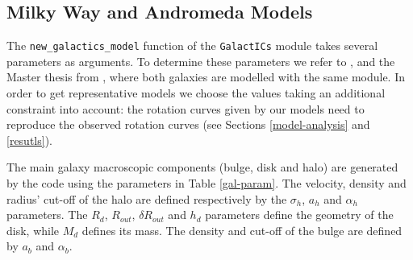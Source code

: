 \documentclass[a4paper,12pt, english]{article}
\begin{document}
\subsection{Milky Way and Andromeda Models}
\label{mw-m31-models}
The \texttt{new\_galactics\_model} function of the \texttt{GalactICs} module takes several parameters as arguments. To determine these parameters we refer to \textcite{Widrow_2005}, \textcite{Widrow_2008} and the Master thesis from \textcite{Withagen_2019}, where both galaxies are modelled with the same module. In order to get representative models we choose the values taking an additional constraint into account: the rotation curves given by our models need to reproduce the observed rotation curves (see Sections \ref{model-analysis} and \ref{resutls}).\par
\smallskip
The main galaxy macroscopic components (bulge, disk and halo) are generated by the code using the parameters in Table \ref{gal-param}. The velocity, density and radius' cut-off of the halo are defined respectively by the \(\sigma_{h}\), \(a_{h}\) and \(\alpha_{h}\) parameters. The \(R_{d}\), \(R_{out}\), \(\delta R_{out}\) and \(h_{d}\) parameters define the geometry of the disk, while \(M_{d}\) defines its mass. The density and cut-off of the bulge are defined by \(a_{b}\) and \(\alpha_{b}\).\par
\end{document}
